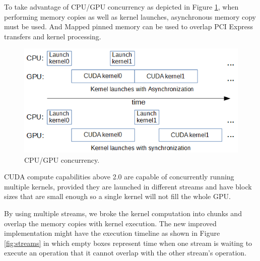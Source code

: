 To take advantage of CPU/GPU concurrency as depicted in Figure \ref{fig:cpu_gpu}, when performing memory copies as well as kernel launches, asynchronous memory copy must be used. And Mapped pinned memory can be used to overlap PCI Express transfers and kernel processing.

\begin{figure}[!htb]
	\centering
	\includegraphics[totalheight=0.3\textwidth]{Figures/cpu_gpu.png}
	\caption{\selectfont CPU/GPU concurrency.}
	\label{fig:cpu_gpu}
\end{figure}

CUDA compute capabilities above 2.0 are capable of concurrently running multiple kernels, provided they are launched in different streams and have block sizes that are small enough so a single kernel will not fill the whole GPU.

By using multiple streams, we broke the kernel computation into chunks and overlap the memory copies with kernel execution. The new improved implementation might have the execution timeline as shown in Figure \ref{fig:streams} in which empty boxes represent time when one stream is waiting to execute an operation that it cannot overlap with the other stream's operation.

